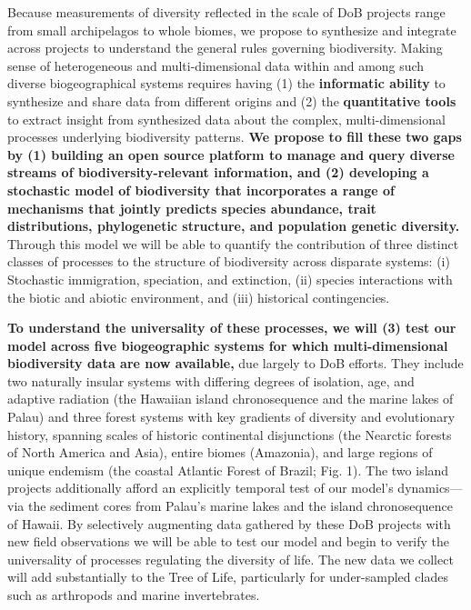 \documentclass[11pt]{article}
\begin{document}
Because measurements of diversity reflected in the scale of DoB
projects range from small archipelagos to whole biomes, we propose to
synthesize and integrate across projects to understand the general
rules governing biodiversity. Making sense of heterogeneous and
multi-dimensional data within and among such diverse biogeographical
systems requires having (1) the \textbf{informatic ability} to
synthesize and share data from different origins and (2) the
\textbf{quantitative tools} to extract insight from synthesized data
about the complex, multi-dimensional processes underlying biodiversity
patterns. \textbf{We propose to fill these two gaps by (1) building an
  open source platform to manage and query diverse streams of
  biodiversity-relevant information, and (2) developing a stochastic
  model of biodiversity that incorporates a range of mechanisms that
  jointly predicts species abundance, trait distributions,
  phylogenetic structure, and population genetic diversity.}  Through
this model we will be able to quantify the contribution of three
distinct classes of processes to the structure of biodiversity across
disparate systems: (i) Stochastic immigration, speciation, and
extinction, (ii) species interactions with the biotic and abiotic
environment, and (iii) historical contingencies.

\textbf{To understand the universality of these processes, we will (3)
  test our model across five biogeographic systems for which
  multi-dimensional biodiversity data are now available,} due largely
to DoB efforts. They include two naturally insular systems with
differing degrees of isolation, age, and adaptive radiation (the
Hawaiian island chronosequence and the marine lakes of Palau) and
three forest systems with key gradients of diversity and evolutionary
history, spanning scales of historic continental disjunctions (the
Nearctic forests of North America and Asia), entire biomes (Amazonia),
and large regions of unique endemism (the coastal Atlantic Forest of
Brazil; Fig. 1). The two island projects additionally afford an
explicitly temporal test of our model's dynamics---via the sediment
cores from Palau's marine lakes and the island chronosequence of
Hawaii. By selectively augmenting data gathered by these DoB projects
with new field observations we will be able to test our model and
begin to verify the universality of processes regulating the diversity
of life. The new data we collect will add substantially to the Tree of
Life, particularly for under-sampled clades such as arthropods and
marine invertebrates.
\end{document}
